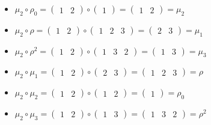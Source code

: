 \documentclass{article}
\begin{document}
\begin{itemize}
        \item $\mu_2\circ\rho_0 =\begin{pmatrix}1&2\end{pmatrix}\circ\begin{pmatrix}1\end{pmatrix}=\begin{pmatrix}1&2\end{pmatrix}=\mu_2$
        \item $\mu_2\circ\rho =\begin{pmatrix}1&2\end{pmatrix}\circ\begin{pmatrix}1&2&3\end{pmatrix}=\begin{pmatrix}2&3\end{pmatrix}=\mu_1$
        \item $\mu_2\circ\rho^2 =\begin{pmatrix}1&2\end{pmatrix}\circ\begin{pmatrix}1&3&2\end{pmatrix}=\begin{pmatrix}1&3\end{pmatrix}=\mu_3$
        \item $\mu_2\circ\mu_1 =\begin{pmatrix}1&2\end{pmatrix}\circ\begin{pmatrix}2&3\end{pmatrix}=\begin{pmatrix}1&2&3\end{pmatrix}=\rho$
        \item $\mu_2\circ\mu_2 =\begin{pmatrix}1&2\end{pmatrix}\circ\begin{pmatrix}1&2\end{pmatrix}=\begin{pmatrix}1\end{pmatrix}=\rho_0$
        \item $\mu_2\circ\mu_3 =\begin{pmatrix}1&2\end{pmatrix}\circ\begin{pmatrix}1&3\end{pmatrix}=\begin{pmatrix}1&3&2\end{pmatrix}=\rho^2$
        

\end{itemize}
\end{document}
